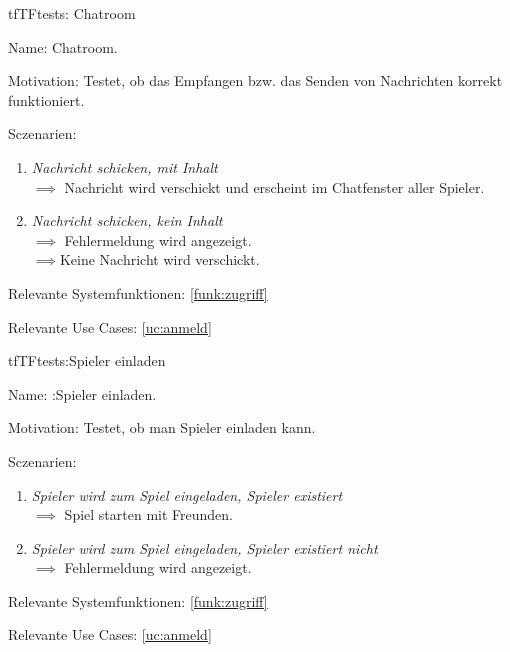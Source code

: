 \begin{description}[leftmargin=5em, style=sameline]

\begin{lhp}{tf}{TF}{tests: Chatroom}
	\item [Name:] Chatroom.
	\item [Motivation:] Testet, ob das Empfangen bzw. das Senden von Nachrichten korrekt funktioniert.
	\item [Sczenarien:] \hfill
		\begin{enumerate}
			\item \textit{Nachricht schicken, mit Inhalt} \\ $\implies$ Nachricht wird verschickt und erscheint im Chatfenster aller Spieler.
			\item \textit{Nachricht schicken, kein Inhalt} \\ $\implies$ Fehlermeldung wird angezeigt.
										\\ $\implies$Keine Nachricht wird verschickt.
		\end{enumerate}
	\item [Relevante Systemfunktionen:] \ref{funk:zugriff}
	\item [Relevante Use Cases:] \ref{uc:anmeld}
\end{lhp}

\end{description}


\begin{description}[leftmargin=5em, style=sameline]

\begin{lhp}{tf}{TF}{tests:Spieler einladen}
	\item [Name:] :Spieler einladen.
	\item [Motivation:] Testet, ob man Spieler einladen kann.
	\item [Sczenarien:] \hfill
		\begin{enumerate}
			\item \textit{Spieler wird zum Spiel eingeladen, Spieler existiert} \\ $\implies$ Spiel starten mit Freunden.
			\item \textit{Spieler wird zum Spiel eingeladen, Spieler existiert nicht} \\ $\implies$ Fehlermeldung wird angezeigt.

		\end{enumerate}
	\item [Relevante Systemfunktionen:] \ref{funk:zugriff}
	\item [Relevante Use Cases:] \ref{uc:anmeld}
\end{lhp}

\end{description}

